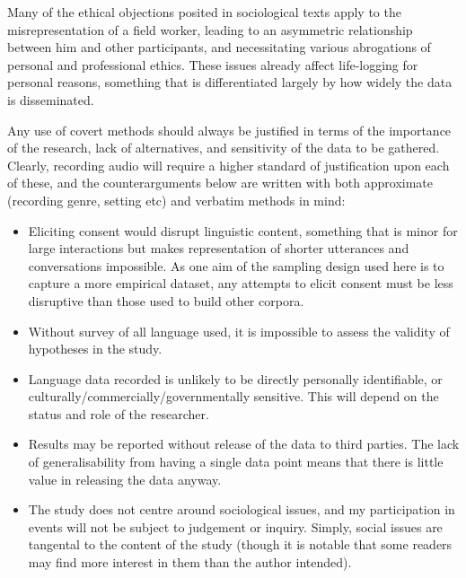 Many of the ethical objections posited in sociological texts apply to the misrepresentation of a field worker, leading to an asymmetric relationship between him and other participants, and necessitating various abrogations of personal and professional ethics.  These issues already affect life-logging for personal reasons, something that is differentiated largely by how widely the data is disseminated.

Any use of covert methods should always be justified in terms of the importance of the research, lack of alternatives, and sensitivity of the data to be gathered. Clearly, recording audio will require a higher standard of justification upon each of these, and the counterarguments below are written with both approximate (recording genre, setting etc) and verbatim methods in mind:

\begin{itemize}
    \item Eliciting consent would disrupt linguistic content, something that is minor for large interactions but makes representation of shorter utterances and conversations impossible. As one aim of the sampling design used here is to capture a more empirical dataset, any attempts to elicit consent must be less disruptive than those used to build other corpora.
    \item Without survey of all language used, it is impossible to assess the validity of hypotheses in the study.
    \item Language data recorded is unlikely to be directly personally identifiable, or culturally/commercially/governmentally sensitive. This will depend on the status and role of the researcher.
    \item Results may be reported without release of the data to third parties. The lack of generalisability from having a single data point means that there is little value in releasing the data anyway.
    \item The study does not centre around sociological issues, and my participation in events will not be subject to judgement or inquiry. Simply, social issues are tangental to the content of the study (though it is notable that some readers may find more interest in them than the author intended).
\end{itemize}



